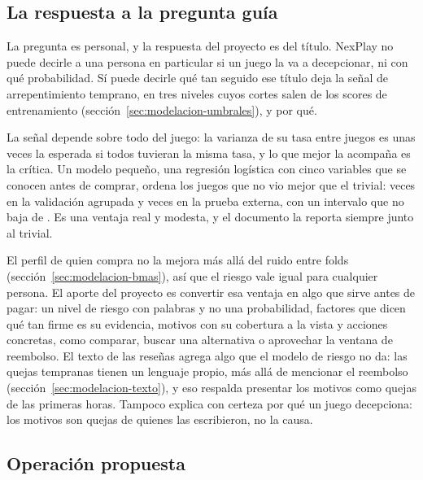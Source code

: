 \subsection{La respuesta a la pregunta guía}\label{sec:conclusiones-hallazgos}

\preguntaguia{} La pregunta es personal, y la respuesta del proyecto es del título. NexPlay no puede
decirle a una persona en particular si un juego la va a decepcionar, ni con qué probabilidad. Sí puede decirle qué
tan seguido ese título deja la señal de arrepentimiento temprano, en tres niveles cuyos cortes salen
de los scores de entrenamiento (sección~\ref{sec:modelacion-umbrales}), y por qué.

La señal depende sobre todo del juego: la varianza de su tasa entre
juegos es unas \cifraSobredispersion{} veces la esperada si todos tuvieran la misma tasa, y lo que
mejor la acompaña es la crítica. Un modelo pequeño, una regresión logística con cinco variables que se conocen antes
de comprar, ordena los juegos que no vio mejor que el trivial: \cifraPRAUCCociente{} veces en la
validación agrupada y \cifraPRAUCExternoCociente{} veces en la prueba externa, con un intervalo que
no baja de \cifraExternoICInf{}. Es una ventaja real y modesta, y el documento la reporta siempre
junto al trivial.

El perfil de quien compra no la mejora más allá del ruido entre folds
(sección~\ref{sec:modelacion-bmas}), así que el riesgo vale igual para cualquier persona. El aporte
del proyecto es convertir esa ventaja en algo que sirve antes de pagar: un nivel de riesgo con
palabras y no una probabilidad, factores que dicen qué tan firme es su
evidencia, motivos con su cobertura a la vista y acciones concretas, como comparar, buscar una
alternativa o aprovechar la ventana de reembolso. El texto de las reseñas agrega algo que el modelo
de riesgo no da: las quejas tempranas tienen un lenguaje propio, más allá de mencionar el reembolso
(sección~\ref{sec:modelacion-texto}), y eso respalda presentar los motivos como quejas de las
primeras horas. Tampoco explica con certeza por qué un juego decepciona: los motivos son quejas de
quienes las escribieron, no la causa.

\subsection{Operación propuesta}\label{sec:operacion}

